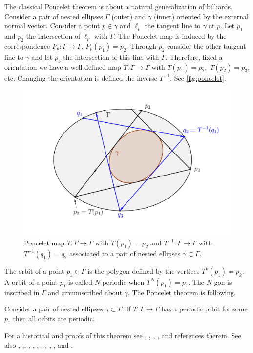 The classical Poncelet theorem is about a natural generalization of billiards. Consider a pair of nested ellipses $\Gamma$ (outer) and $\gamma$ (inner) oriented by the external normal vector.
Consider a point $p\in \gamma$ and  $\ell_p$ the   tangent line  to $\gamma$ at $p$. Let $p_1$ and $p_2$ the intersection of  $\ell_p$ with $\Gamma.$ The Poncelet map is induced by the correspondence
$P_p:\Gamma\to\Gamma$, $P_p(p_1)=p_2$. Through $p_2$ consider the other tangent line to $\gamma$ and let $p_3$ the intersection of this line with $\Gamma$. Therefore, fixed a orientation we have a well defined map $T:\Gamma\to \Gamma$ with $T(p_1)=p_2,$ $T(p_2)=p_3$, etc. 
Changing the orientation is defined the inverse $T^{-1}.$ See  \cref{fig:poncelet}.

\begin{figure}[H]
	\begin{center}
	 \includegraphics[scale=0.5]{chap_02/pics/pics_chap2-030-poncelet-map.pdf}
		\caption {Poncelet map  $T:\Gamma\to\Gamma$ with $T(p_1)=p_2$ and $T^{-1}:\Gamma\to\Gamma$ with $T^{-1}(q_1)=q_2$ associated to  a pair of nested ellipses $\gamma\subset\Gamma$.
		\label{fig:poncelet-map}}
	\end{center}
\end{figure}

The orbit of a point $p_1\in \Gamma$ is the polygon defined by the vertices $T^k(p_1)=p_k.$ 
A orbit of a point $p_1$ is called $N$-periodic when $T^N(p_1)=p_1.$ The $N$-gon is inscribed in $\Gamma$
and circumscribed about $\gamma.$
The Poncelet theorem is following.
\begin{theorem} Consider a pair of nested ellipses $\gamma\subset \Gamma$. If $T:\Gamma\to\Gamma$ has a periodic orbit for some $p_1$ then all orbits are periodic. 
\end{theorem}
%
For a historical and proofs of this theorem see \cite{barth1996}, \cite{centina2016a}, \cite{centina2016b}, \cite{chasles1843}, \cite{drag2014} and references therein. See also    \cite[Chapter IV]{berger2010},  \cite{cima2010},\cite{cieslak2016}, \cite[Livre III, Chapitres II, III]{darboux1917}, \cite{drag_milena2011},  \cite[Chapter 9]{gla2016}, \cite{hahu2015}, \cite{hahu2017}, \cite{leb1921},  \cite{mirman2012},  \cite{poncelet1822} and \cite{previ1999}.

